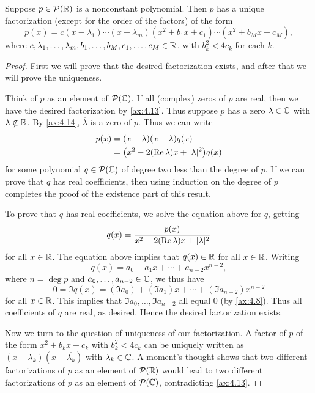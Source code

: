 \begin{result}\label{ax:4.16}
Suppose $p\in\mathcal{P}(\mathbb{R})$ is a nonconstant polynomial. Then $p$ has a unique
factorization (except for the order of the factors) of the form
\[ p(x) = c(x-\lambda_1)\cdots(x-\lambda_m)(x^2+b_1x+c_1)\cdots(x^2+b_Mx+c_M), \]
where $c,\lambda_1,\dots,\lambda_m,b_1,\dots,b_M,c_1,\dots,c_M\in\mathbb{R}$, with
$b_k^2<4c_k$ for each $k$.
\end{result}

\begin{proof}
First we will prove that the desired factorization exists, and after that we
will prove the uniqueness.

Think of $p$ as an element of $\mathcal{P}(\mathbb{C})$. If all (complex) zeros of $p$ are
real, then we have the desired factorization by \ref{ax:4.13}. Thus suppose
$p$ has a zero $\lambda\in\mathbb{C}$ with $\lambda\notin\mathbb{R}$. By \ref{ax:4.14},
$\overline{\lambda}$ is a zero of $p$. Thus we can write
\begin{align*}
p(x) &= (x-\lambda)(x-\overline{\lambda})q(x)\\
     &= \bigl(x^2-2(\operatorname{Re}\lambda)x+\lvert \lambda \rvert^2\bigr)q(x)
\end{align*}
for some polynomial $q\in\mathcal{P}(\mathbb{C})$ of degree two less than the degree of $p$.
If we can prove that $q$ has real coefficients, then using induction on the
degree of $p$ completes the proof of the existence part of this result.

To prove that $q$ has real coefficients, we solve the equation above for $q$,
getting
\[ q(x) = \frac{p(x)}{x^2-2(\operatorname{Re}\lambda)x+\lvert \lambda \rvert^2} \]
for all $x\in\mathbb{R}$. The equation above implies that $q(x)\in\mathbb{R}$ for all
$x\in\mathbb{R}$. Writing
\[ q(x) = a_0+a_1x+\cdots+a_{n-2}x^{n-2}, \]
where $n=\deg p$ and $a_0,\dots,a_{n-2}\in\mathbb{C}$, we thus have
\[ 0 = \Im q(x) = (\Im a_0)+(\Im a_1)x+\cdots+(\Im a_{n-2})x^{n-2} \]
for all $x\in\mathbb{R}$. This implies that $\Im a_0,\dots,\Im a_{n-2}$ all equal $0$
(by \ref{ax:4.8}). Thus all coefficients of $q$ are real, as desired. Hence the
desired factorization exists.

Now we turn to the question of uniqueness of our factorization. A factor of $p$
of the form $x^2+b_kx+c_k$ with $b_k^2<4c_k$ can be uniquely written as
$(x-\lambda_k)(x-\overline{\lambda_k})$ with $\lambda_k\in\mathbb{C}$. A moment's
thought shows that two different factorizations of $p$ as an element of
$\mathcal{P}(\mathbb{R})$ would lead to two different factorizations of $p$ as an element of
$\mathcal{P}(\mathbb{C})$, contradicting \ref{ax:4.13}.
\end{proof}

